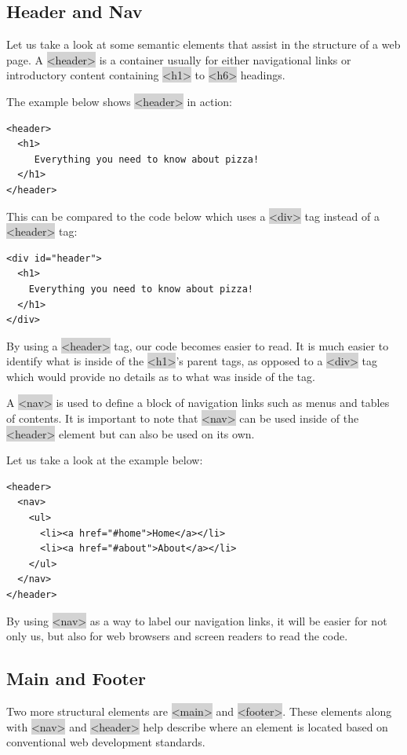 \documentclass[11pt]{article}
\begin{document}
\subsection{Header and Nav}
Let us take a look at some semantic elements that assist in the structure of a web page. A \colorbox{lightgray}{<header>} is a container usually for either navigational links or introductory content containing \colorbox{lightgray}{<h1>} to \colorbox{lightgray}{<h6>} headings.

The example below shows \colorbox{lightgray}{<header>} in action:
\begin{lstlisting}
<header>
  <h1>
     Everything you need to know about pizza!
  </h1>
</header>
\end{lstlisting}
This can be compared to the code below which uses a \colorbox{lightgray}{<div>} tag instead of a \colorbox{lightgray}{<header>} tag:
\begin{lstlisting}
<div id="header">
  <h1>
    Everything you need to know about pizza!
  </h1>
</div>
\end{lstlisting}
By using a \colorbox{lightgray}{<header>} tag, our code becomes easier to read. It is much easier to identify what is inside of the \colorbox{lightgray}{<h1>}'s parent tags, as opposed to a \colorbox{lightgray}{<div>} tag which would provide no details as to what was inside of the tag.

A \colorbox{lightgray}{<nav>} is used to define a block of navigation links such as menus and tables of contents. It is important to note that \colorbox{lightgray}{<nav>} can be used inside of the \colorbox{lightgray}{<header>} element but can also be used on its own.

Let us take a look at the example below:
\begin{lstlisting}
<header> 
  <nav>
    <ul>
      <li><a href="#home">Home</a></li>
      <li><a href="#about">About</a></li>      
    </ul>
  </nav>
</header>
\end{lstlisting}
By using \colorbox{lightgray}{<nav>} as a way to label our navigation links, it will be easier for not only us, but also for web browsers and screen readers to read the code.

\subsection{Main and Footer}
Two more structural elements are \colorbox{lightgray}{<main>} and \colorbox{lightgray}{<footer>}. These elements along with \colorbox{lightgray}{<nav>} and \colorbox{lightgray}{<header>} help describe where an element is located based on conventional web development standards.
\end{document}
